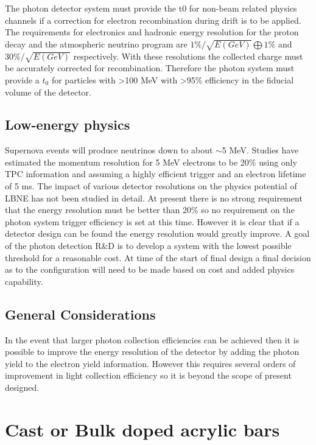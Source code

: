 The photon detector system must provide the t0 for non-beam related physics channels if a correction for electron recombination during drift is to be applied. The requirements for electronics and hadronic energy resolution for the proton decay and the atmospheric neutrino program are $1\% / \sqrt{E(GeV)} \bigoplus 1\%$ and $30\% / \sqrt{E(GeV)}$  respectively. With these resolutions the collected charge must be accurately corrected for recombination. Therefore the photon system must provide a $t_{0}$ for particles with >100 MeV with >95\% efficiency in the fiducial volume of the detector. 


\subsection{Low-energy physics}

Supernova events will produce neutrinos down to about $\sim$5 MeV. Studies have estimated the momentum resolution for 5 MeV electrons to be 20\% using only TPC information and assuming a highly efficient trigger and an electron lifetime of 5 ms. The impact of various detector resolutions on the physics potential of LBNE has not been studied in detail. At present there is no strong requirement that the energy resolution must be better than 20\% so no requirement on the photon system trigger efficiency is set at this time. However it is clear that if a detector design can be found the energy resolution would greatly improve. A goal of the photon detection R\&D is to develop a system with the lowest possible threshold for a reasonable cost. At time of the start of final design a final decision as to the configuration will need to be made based on cost and added physics capability.

\subsection{General Considerations}
In the event that larger photon collection efficiencies can be achieved then it is possible to improve the energy resolution of the detector by adding the photon yield to the electron yield information.  However this requires several orders of improvement in light collection efficiency so it is beyond the scope of present designed.

\section{Cast or Bulk doped acrylic bars}

